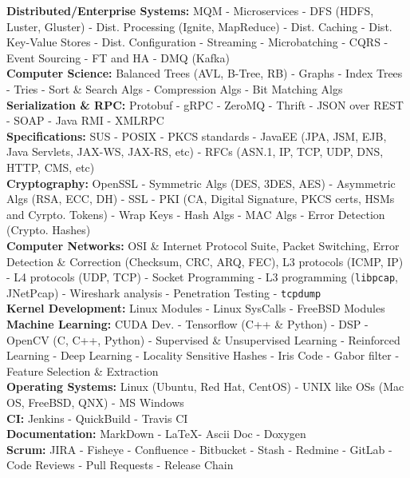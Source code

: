 \documentclass[10pt,a4paper]{article}
\begin{document}
\textbullet \hspace{0.1cm}\textbf{Distributed/Enterprise Systems:} MQM - Microservices - DFS (HDFS, Luster, Gluster) - Dist. Processing (Ignite, MapReduce) - Dist. Caching - Dist. Key-Value Stores - Dist. Configuration - Streaming - Microbatching - CQRS - Event Sourcing - FT and HA - DMQ (Kafka)  \\
\textbullet \hspace{0.1cm}\textbf{Computer Science:} Balanced Trees (AVL, B-Tree, RB) - Graphs - Index Trees - Tries - Sort \& Search Algs - Compression Algs - Bit Matching Algs  \\
\textbullet \hspace{0.1cm}\textbf{Serialization \& RPC:} Protobuf - gRPC - ZeroMQ - Thrift - JSON over REST - SOAP - Java RMI - XMLRPC \\
\textbullet \hspace{0.1cm}\textbf{Specifications:} SUS - POSIX - PKCS standards - JavaEE (JPA, JSM, EJB, Java Servlets, JAX-WS, JAX-RS, etc) - RFCs (ASN.1, IP, TCP, UDP, DNS, HTTP, CMS, etc) \\
\textbullet \hspace{0.1cm}\textbf{Cryptography:} OpenSSL - Symmetric Algs (DES, 3DES, AES) - Asymmetric Algs (RSA, ECC, DH) - SSL - PKI (CA, Digital Signature, PKCS certs, HSMs and Cyrpto. Tokens) - Wrap Keys - Hash Algs - MAC Algs - Error Detection (Crypto. Hashes)  \\ 
\textbullet \hspace{0.1cm}\textbf{Computer Networks:} OSI \& Internet Protocol Suite, Packet Switching, Error Detection \& Correction (Checksum, CRC, ARQ, FEC), L3 protocols (ICMP, IP) - L4 protocols (UDP, TCP) - Socket Programming - L3 programming (\texttt{libpcap}, JNetPcap) - Wireshark analysis - Penetration Testing - \texttt{tcpdump} \\
\textbullet \hspace{0.1cm}\textbf{Kernel Development:} Linux Modules - Linux SysCalls - FreeBSD Modules \\
\textbullet \hspace{0.1cm}\textbf{Machine Learning:} CUDA Dev. - Tensorflow (C++ \& Python) - DSP - OpenCV (C, C++, Python) - Supervised \& Unsupervised Learning - Reinforced Learning - Deep Learning - Locality Sensitive Hashes - Iris Code - Gabor filter - Feature Selection \& Extraction \\
\textbullet \hspace{0.1cm}\textbf{Operating Systems:} Linux (Ubuntu, Red Hat, CentOS) - UNIX like OSs (Mac OS, FreeBSD, QNX) - MS Windows \\
\textbullet \hspace{0.1cm}\textbf{CI:} Jenkins - QuickBuild - Travis CI \\
\textbullet \hspace{0.1cm}\textbf{Documentation:} MarkDown - \LaTeX - Ascii Doc - Doxygen \\
\textbullet \hspace{0.1cm}\textbf{Scrum:} JIRA - Fisheye - Confluence - Bitbucket - Stash - Redmine - GitLab -Code Reviews - Pull Requests - Release Chain
\end{document}
